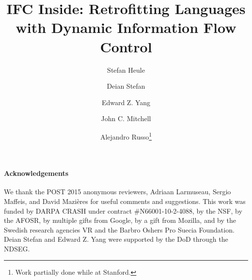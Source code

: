 \documentclass{llncs}
\newif\ifextended
\begin{document}


\title{
IFC Inside: Retrofitting Languages with Dynamic Information Flow Control
}
\ifextended
\subtitle{Extended Version}
\fi

\author{
 Stefan Heule \and
 Deian Stefan \and
 Edward Z. Yang \and
 John C. Mitchell \and
 Alejandro Russo\protect\footnote{Work partially done while at Stanford.}
}

\maketitle


{
\small
\paragraph{Acknowledgements}
We thank the POST 2015 anonymous reviewers,
Adriaan Larmuseau,
Sergio Maffeis, and
David Mazi\`eres
for useful comments and suggestions.
%
This work was funded by DARPA CRASH under contract \#N66001-10-2-4088,
by the NSF, by the AFOSR,
by multiple gifts from Google, by a gift from Mozilla,
and by the Swedish research agencies VR and the Barbro Oshers Pro
Suecia Foundation.
%
Deian Stefan and Edward Z. Yang were supported by the DoD through the
NDSEG.
}


{
\ifextended%
\else%
\frenchspacing\scriptsize
\setlength{\bibsep}{2pt}
\fi%
  
  
}

\ifextended
\clearpage
\balance
\fi
\end{document}
